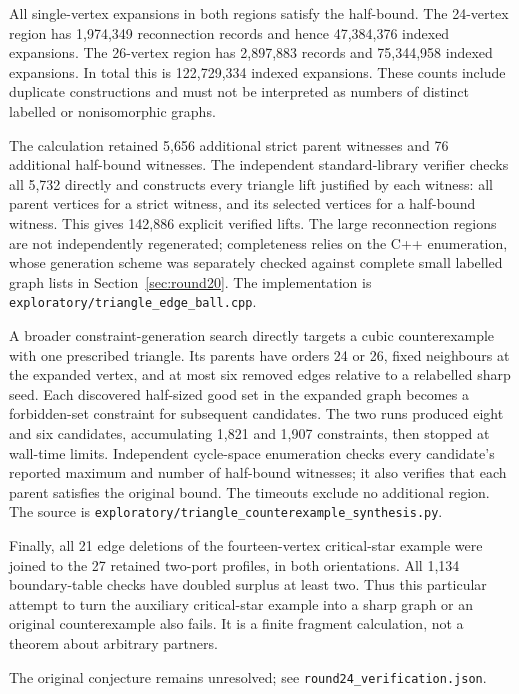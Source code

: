 \documentclass[11pt]{article}
\begin{document}
All single-vertex expansions in both regions satisfy the half-bound.
The 24-vertex region has 1,974,349 reconnection records and hence
47,384,376 indexed expansions. The 26-vertex region has 2,897,883
records and 75,344,958 indexed expansions. In total this is
122,729,334 indexed expansions. These counts include duplicate
constructions and must not be interpreted as numbers of distinct
labelled or nonisomorphic graphs.

The calculation retained 5,656 additional strict parent witnesses
and 76 additional half-bound witnesses. The independent standard-library
verifier checks all 5,732 directly and constructs every triangle
lift justified by each witness: all parent vertices for a strict
witness, and its selected vertices for a half-bound witness. This
gives 142,886 explicit verified lifts. The large reconnection
regions are not independently regenerated; completeness relies on
the C++ enumeration, whose generation scheme was separately checked
against complete small labelled graph lists in Section~\ref{sec:round20}.
The implementation is \texttt{exploratory/triangle\_edge\_ball.cpp}.

A broader constraint-generation search directly targets a cubic
counterexample with one prescribed triangle. Its parents have orders
24 or 26, fixed neighbours at the expanded vertex, and at most six
removed edges relative to a relabelled sharp seed. Each discovered
half-sized good set in the expanded graph becomes a forbidden-set
constraint for subsequent candidates. The two runs produced eight
and six candidates, accumulating 1,821 and 1,907 constraints, then
stopped at wall-time limits. Independent cycle-space enumeration
checks every candidate's reported maximum and number of half-bound
witnesses; it also verifies that each parent satisfies the original
bound. The timeouts exclude no additional region. The source is
\texttt{exploratory/triangle\_counterexample\_synthesis.py}.

Finally, all 21 edge deletions of the fourteen-vertex critical-star
example were joined to the 27 retained two-port profiles, in both
orientations. All 1,134 boundary-table checks have doubled surplus
at least two. Thus this particular attempt to turn the auxiliary
critical-star example into a sharp graph or an original counterexample
also fails. It is a finite fragment calculation, not a theorem about
arbitrary partners.

The original conjecture remains unresolved; see \texttt{round24\_verification.json}.
\end{document}
